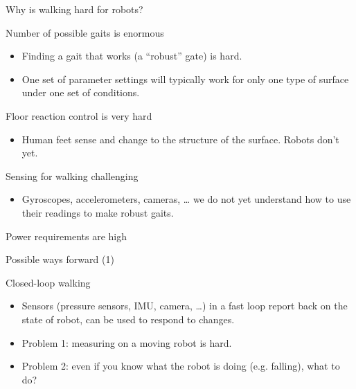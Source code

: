 \documentclass[compress]{beamer}
\begin{document}

\begin{frame}{Why is walking hard for robots?}

    Number of possible gaits is enormous

    \begin{itemize}

        \item Finding a gait that works (a ``robust'' gate) is hard.
        \item One set of parameter settings will typically work for only one type of
            surface under one set of conditions.
    \end{itemize}

    Floor reaction control is very hard

    \begin{itemize}

        \item Human feet sense and change to the structure of the surface. Robots
            don't yet.
    \end{itemize}

    Sensing for walking challenging

    \begin{itemize}

        \item Gyroscopes, accelerometers, cameras, \ldots{} we do not yet understand
            how to use their readings to make robust gaits.
    \end{itemize}

    Power requirements are high

\end{frame}

\begin{frame}{Possible ways forward (1)}

    Closed-loop walking

    \begin{itemize}

        \item Sensors (pressure sensors, IMU, camera, \ldots{}) in a fast loop
            report back on the state of robot, can be used to respond to changes.
        \item Problem 1: measuring on a moving robot is hard.
        \item Problem 2: even if you know what the robot is doing (e.g. falling),
            what to do?
    \end{itemize}

\end{frame}
\end{document}
